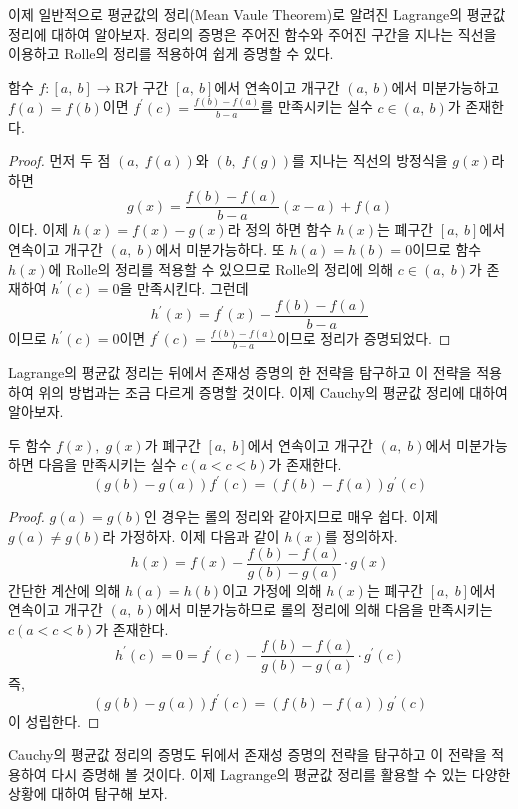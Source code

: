 \documentclass[a4paper]{article}
\begin{document}
이제 일반적으로 평균값의 정리(Mean Vaule Theorem)로 알려진 Lagrange의 평균값 정리에 대하여 알아보자. 정리의 증명은 주어진 함수와 주어진 구간을 지나는 직선을 이용하고 Rolle의 정리를 적용하여 쉽게 증명할 수 있다.

\begin{theorem}
 함수 $f:[a,\: b]\to\mathrm{R}$가 구간 $[a,\: b]$에서 연속이고 개구간 $(a,\: b)$에서 미분가능하고 $f(a)=f(b)$이면 $f^{\prime}(c)=\frac{f(b)-f(a)}{b-a}$를 만족시키는 실수 $c \in(a,\: b)$가 존재한다.
 \begin{proof}
 	먼저 두 점 $(a, \;f(a))$와 $(b, \;f(g))$를 지나는 직선의 방정식을 $g(x)$라 하면
 	\[
 	g(x) = \frac{f(b)-f(a)}{b-a} \left(x-a\right) + f(a)
 	\]
 	이다. 이제 $h(x) = f(x) - g(x)$라 정의 하면 함수 $h(x)$는 폐구간 $[a,\: b]$에서 연속이고 개구간 $(a,\; b)$에서 미분가능하다. 또 $h(a)=h(b)=0$이므로 함수 $h(x)$에 Rolle의 정리를 적용할 수 있으므로 Rolle의 정리에 의해 $c \in \left(a, \; b\right)$가 존재하여 $h^{\prime}(c)=0$을 만족시킨다. 그런데 
 	\[
 	h^{\prime}(x) = f^{\prime}(x) - \frac{f(b)-f(a)}{b-a}
 	\]
 	이므로 $h^{\prime}(c)=0$이면 $f^{\prime}(c)=\frac{f(b)-f(a)}{b-a}$이므로 정리가 증명되었다.
 \end{proof}
\end{theorem}

Lagrange의 평균값 정리는 뒤에서 존재성 증명의 한 전략을 탐구하고 이 전략을 적용하여 위의 방법과는 조금 다르게 증명할 것이다. 이제 Cauchy의 평균값 정리에 대하여 알아보자.

\vspace{1em}
\begin{theorem}
	두 함수 $f(x), \;g(x)$가 폐구간 $[a, \; b]$에서 연속이고 개구간 $(a, \; b)$에서 미분가능하면 다음을 만족시키는 실수 $c(a<c<b)$가 존재한다.
	\[
	(g(b)-g(a))f^{\prime}(c) = (f(b)-f(a))g^{\prime}(c)
	\]
	\begin{proof}
		$g(a)=g(b)$인 경우는 롤의 정리와 같아지므로 매우 쉽다.  이제 $g(a) \ne g(b)$라 가정하자. 이제 다음과 같이 $h(x)$를 정의하자.
		\[
		h(x) = f(x) - \frac{f(b)-f(a)}{g(b)-g(a)} \cdot g(x)
		\]
		간단한 계산에 의해 $h(a) =h(b)$이고 가정에 의해 $h(x)$는 폐구간 $[a,\;b]$에서 연속이고 개구간 $(a, \; b)$에서 미분가능하므로 롤의 정리에 의해 다음을 만족시키는 $c(a<c<b)$가 존재한다.
		\[
		h^{\prime}(c) =0 = f^{\prime}(c) - \frac{f(b)-f(a)}{g(b)-g(a)} \cdot g^{\prime}(c)
		\]
		즉,
		\[
		(g(b)-g(a))f^{\prime}(c) = (f(b)-f(a))g^{\prime}(c)
		\]
		이 성립한다.
	\end{proof}
\end{theorem}
  Cauchy의 평균값 정리의 증명도 뒤에서 존재성 증명의 전략을 탐구하고 이 전략을 적용하여 다시 증명해 볼 것이다. 이제 Lagrange의 평균값 정리를 활용할 수 있는 다양한 상황에 대하여 탐구해 보자.
  
\end{document}
